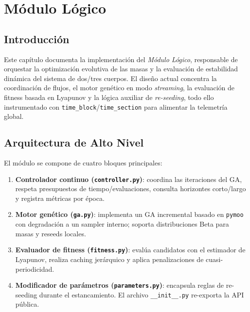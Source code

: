 
\section{Módulo Lógico}%
\label{cap:implementacion-modulo-logico}

\subsection{Introducción}
Este capítulo documenta la implementación del \emph{Módulo Lógico}, responsable de orquestar la optimización evolutiva de las masas y la evaluación de estabilidad dinámica del sistema de dos/tres cuerpos. El diseño actual concentra la coordinación de flujos, el motor genético en modo \emph{streaming}, la evaluación de fitness basada en Lyapunov y la lógica auxiliar de \emph{re-seeding}, todo ello instrumentado con \texttt{time\_block}/\texttt{time\_section} para alimentar la telemetría global.

\subsection{Arquitectura de Alto Nivel}
El módulo se compone de cuatro bloques principales:
\begin{enumerate}
    \item \textbf{Controlador continuo (\texttt{controller.py})}: coordina las iteraciones del GA, respeta presupuestos de tiempo/evaluaciones, consulta horizontes corto/largo y registra métricas por época.
    \item \textbf{Motor genético (\texttt{ga.py})}: implementa un GA incremental basado en \texttt{pymoo} con degradación a un sampler interno; soporta distribuciones Beta para masas y reseeds locales.
    \item \textbf{Evaluador de fitness (\texttt{fitness.py})}: evalúa candidatos con el estimador de Lyapunov, realiza caching jerárquico y aplica penalizaciones de cuasi-periodicidad.
    \item \textbf{Modificador de parámetros (\texttt{parameters.py})}: encapsula reglas de re-seeding durante el estancamiento. El archivo \texttt{\_\_init\_\_.py} re-exporta la API pública.
\end{enumerate}

